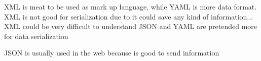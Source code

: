 XML is meat to be used as mark up language, while YAML is more data format.
XML is not good for serialization due to it could save any kind of information...
XML could be very difficult to understand
JSON and YAML are pretended more for data serialization

JSON is usually used in the web because is good to send information